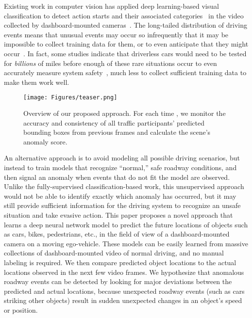 \documentclass[letterpaper, 10 pt, conference]{ieeeconf}
\theoremstyle{definition}
\theoremstyle{remark}
\begin{document}
Existing work in computer vision has applied deep learning-based visual
classification to detect action starts and their associated
categories~\cite{gao2019startnet} in the video collected by dashboard-mounted
cameras~\cite{chan2016anticipating}. The
long-tailed distribution of driving events means that unusual events
may occur so infrequently that it may be impossible to collect
training data for them, or to even anticipate that
they might occur~\cite{liu2018future}.
In fact, some studies indicate that driverless cars would need to be
tested for \textit{billions} of miles before enough of these rare
situations occur to even accurately measure system
safety~\cite{kalra2016driving}, much less to collect sufficient
training data to make them work well.

\begin{figure}
    \centering
    \texttt{[image: Figures/teaser.png]}
    \caption{
        Overview of our proposed approach. For each time , we monitor
        the accuracy and consistency of all traffic participants'
        predicted bounding boxes from previous frames and
        calculate the scene's anomaly score.
    }
    \vspace{-5pt}
    \label{fig:teaser}
    \vspace{-10pt}
\end{figure}

An alternative approach is to avoid modeling all possible driving
scenarios, but instead to train models that recognize ``normal,''
safe roadway conditions, and then signal an anomaly when events that
do not fit the model are observed.
Unlike the fully-supervised classification-based work, this unsupervised 
approach would not be able to identify exactly which anomaly has occurred,
but it may still provide sufficient information for the driving system to
recognize an unsafe situation and take evasive action.
This paper proposes a novel approach that learns a deep neural
network model to predict the future locations of objects such as
cars, bikes, pedestrians, etc., in the field of view of a
dashboard-mounted camera on a moving ego-vehicle. 
These models can be easily learned from massive collections of dashboard-mounted
video of normal driving, and no manual labeling is required.
We then compare predicted object locations to the actual locations observed in
the next few video frames. We hypothesize that anomalous roadway
events can be detected by looking for major deviations between the
predicted and actual locations, because unexpected roadway events
(such as cars striking other objects) result in sudden
unexpected changes in an object's speed or position.
\end{document}

